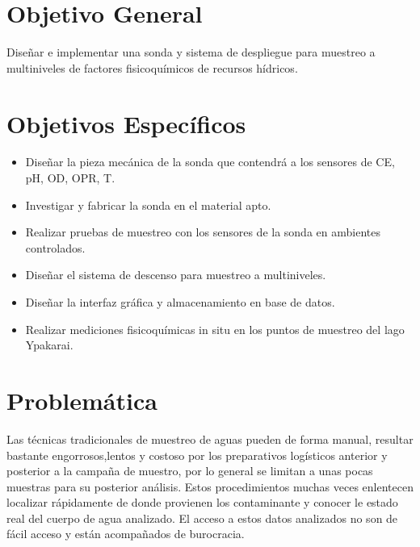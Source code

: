 \section{Objetivo General}
Diseñar e implementar una sonda y sistema de despliegue para muestreo a multiniveles de factores fisicoquímicos de recursos hídricos.


\section{Objetivos Específicos} \label{Objetivos}
\begin{itemize}
	\item Diseñar la pieza mecánica de la sonda que contendrá a los sensores de CE, pH, OD, OPR, T.
    \item Investigar y fabricar  la sonda en el material apto.
    \item Realizar pruebas de muestreo con los sensores de la sonda en ambientes controlados.
    \item Diseñar el sistema de descenso para muestreo a multiniveles.
    \item Diseñar la interfaz gráfica y almacenamiento en base de datos.  
    \item Realizar mediciones fisicoquímicas in situ en los puntos de muestreo del lago Ypakarai.

\end{itemize}

\section{Problemática} 

 Las técnicas tradicionales de muestreo  de aguas  pueden de forma manual, resultar bastante engorrosos,lentos y costoso por los preparativos logísticos anterior y posterior a la campaña de muestro, por lo general se limitan a unas pocas muestras para su posterior análisis. 
 Estos procedimientos muchas veces enlentecen localizar rápidamente de donde provienen los contaminante y conocer le estado real del cuerpo de agua analizado. El acceso a estos datos analizados no son de fácil acceso y están acompañados de burocracia.  


 
